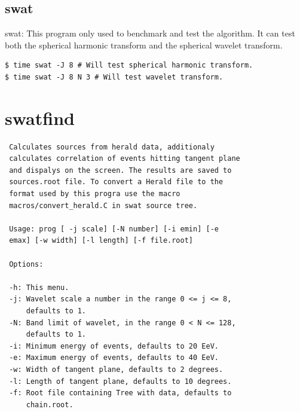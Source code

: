 \documentclass[12pt]{article}
\begin{document}
\subsection{swat}
swat: This program only used to benchmark and test the algorithm. It can test
both the spherical harmonic transform and the spherical wavelet transform.
{\bf \color{brown}
\begin{lstlisting}
$ time swat -J 8 # Will test spherical harmonic transform.
$ time swat -J 8 N 3 # Will test wavelet transform.
\end{lstlisting}
}

\appendix
\section{swatfind}
{\bf \color{brown}
   \begin{lstlisting}
 Calculates sources from herald data, additionaly
 calculates correlation of events hitting tangent plane
 and dispalys on the screen. The results are saved to
 sources.root file. To convert a Herald file to the
 format used by this progra use the macro
 macros/convert_herald.C in swat source tree.
 
 Usage: prog [ -j scale] [-N number] [-i emin] [-e
 emax] [-w width] [-l length] [-f file.root]

 Options:

 -h: This menu.
 -j: Wavelet scale a number in the range 0 <= j <= 8,
     defaults to 1.
 -N: Band limit of wavelet, in the range 0 < N <= 128,
     defaults to 1.
 -i: Minimum energy of events, defaults to 20 EeV.
 -e: Maximum energy of events, defaults to 40 EeV.
 -w: Width of tangent plane, defaults to 2 degrees.
 -l: Length of tangent plane, defaults to 10 degrees.
 -f: Root file containing Tree with data, defaults to
     chain.root.
   \end{lstlisting}
}
\newpage
\end{document}
